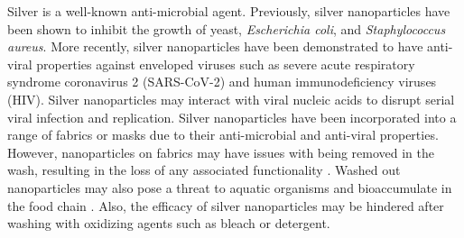 \documentclass[journal=jacsat,manuscript=article]{achemso}
\begin{document}
Silver is a well-known anti-microbial agent.\cite{lansdown:06,Rai:09}
 Previously, silver nanoparticles have been shown to inhibit the growth of yeast, \textit{Escherichia coli}, and \textit{Staphylococcus aureus}. \cite{Kim:07mar} %
More recently, silver nanoparticles have been demonstrated to have anti-viral properties against enveloped viruses such as severe acute respiratory syndrome coronavirus 2 (SARS-CoV-2) and human immunodeficiency viruses (HIV).\cite{jeremiah_potent_2020,lara_2010} 
Silver nanoparticles may interact with viral nucleic acids to disrupt serial viral infection and replication.\cite{jeremiah_potent_2020}
Silver nanoparticles have been incorporated into a range of 
fabrics or masks due to their anti-microbial and anti-viral properties.\cite{bu_fabrication_2019,perera_morphological_2013, lvm:10, zhong_plasmonic_2020,tremiliosi_ag_2020}
However, nanoparticles on fabrics may have issues with being removed in the wash, resulting in the loss of any associated functionality \cite{Lorenz:12,Impellitteri:09}.
Washed out nanoparticles 
may also pose a threat to aquatic organisms \cite{Krysanov:10,Ma:13_nanoparticle,Fabrega:11,Pillai:14}
and bioaccumulate in the food chain \cite{Uddin:20}.
Also, the efficacy of silver nanoparticles may be hindered after washing with oxidizing agents such as bleach or detergent.\cite{lansdown:06}  




\end{document}

